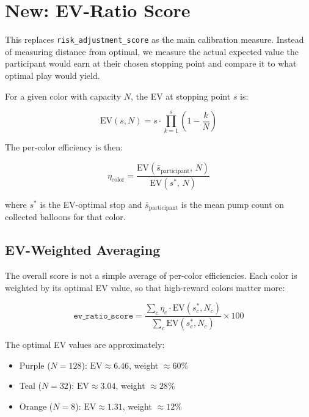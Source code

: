 \documentclass[11pt,a4paper]{article}
\begin{document}
\section{New: EV-Ratio Score}
\label{sec:ev_ratio}

This replaces \texttt{risk\_adjustment\_score} as the main calibration
measure. Instead of measuring distance from optimal, we measure the actual
expected value the participant would earn at their chosen stopping point
and compare it to what optimal play would yield.

For a given color with capacity $N$, the EV at stopping point $s$ is:

\begin{equation}
    \text{EV}(s, N) = s \cdot \prod_{k=1}^{s} \left(1 - \frac{k}{N}\right)
\end{equation}

The per-color efficiency is then:

\begin{equation}
    \eta_{\text{color}} = \frac{\text{EV}(\bar{s}_{\text{participant}},\, N)}
                               {\text{EV}(s^*,\, N)}
\end{equation}

where $s^*$ is the EV-optimal stop and $\bar{s}_{\text{participant}}$ is
the mean pump count on collected balloons for that color.

\subsection{EV-Weighted Averaging}

The overall score is not a simple average of per-color efficiencies. Each
color is weighted by its optimal EV value, so that high-reward colors
matter more:

\begin{equation}
    \texttt{ev\_ratio\_score} = \frac{\sum_c \eta_c \cdot \text{EV}(s^*_c, N_c)}
                                     {\sum_c \text{EV}(s^*_c, N_c)} \times 100
\end{equation}

The optimal EV values are approximately:
\begin{itemize}[nosep]
    \item \textcolor{purpleballoon}{Purple} ($N=128$): $\text{EV} \approx 6.46$, weight $\approx 60\%$
    \item \textcolor{tealballoon}{Teal} ($N=32$): $\text{EV} \approx 3.04$, weight $\approx 28\%$
    \item \textcolor{orangeballoon}{Orange} ($N=8$): $\text{EV} \approx 1.31$, weight $\approx 12\%$
\end{itemize}
\end{document}
